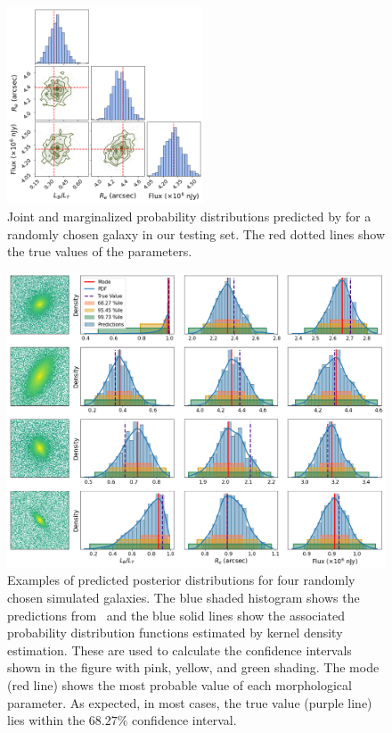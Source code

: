 \begin{figure}[htb]
    \centering
    \includegraphics[width
    =0.52\textwidth]{corner.png}
    \caption{Joint and marginalized probability distributions predicted by \gampen{} for a randomly chosen galaxy in our testing set. The red dotted lines show the true values of the parameters.}
    \label{fig_c2:corner}
\end{figure}

\begin{figure}[htb]
    \centering
    \includegraphics[width
    =\textwidth]{example_predicted_distributions_2.png}
    \caption{Examples of predicted posterior distributions for four randomly chosen simulated galaxies. The blue shaded histogram shows the predictions from \gampen\, and the blue solid lines show the associated probability distribution functions estimated by kernel density estimation. These are used to calculate the confidence intervals shown in the figure with pink, yellow, and green shading. The mode (red line) shows the most probable value of each morphological parameter. As expected, in most cases, the true value (purple line) lies within the $68.27\%$ confidence interval.}
    \label{fig_c2:example_pred_dists}
\end{figure}

